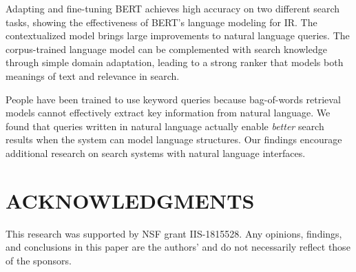 \documentclass[sigconf]{acmart}
\begin{document}
Adapting and fine-tuning BERT achieves high accuracy on two different search tasks, showing the effectiveness of BERT's language modeling for IR. The contextualized model brings large improvements to natural language queries. 
The corpus-trained language model can be complemented with search knowledge through simple domain adaptation, leading to a strong ranker that models both  meanings of text and relevance in search.


People have been trained to use keyword queries because bag-of-words retrieval models cannot effectively extract key information from natural language. We found that queries written in natural language actually enable \textit{better} search results when the system can model language structures. Our findings encourage additional research on search systems with natural language interfaces.  

%
 
\section{ACKNOWLEDGMENTS}
This research was supported by NSF grant IIS-1815528. Any opinions, findings, and conclusions in this paper are the authors' and do not necessarily reflect those of the sponsors.





\end{document}
